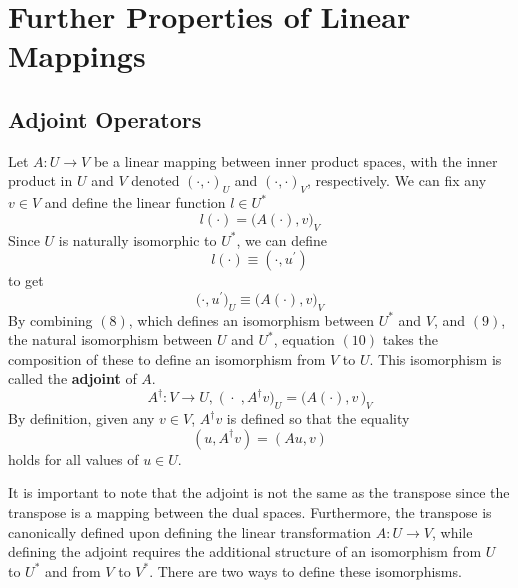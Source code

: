\section{Further Properties of Linear Mappings}

\subsection{Adjoint Operators}

  \begin{definition}
    Let $A: U \longrightarrow V$ be a linear mapping between inner product spaces, with the inner product in $U$ and $V$ denoted $(\cdot,\cdot)_U$ and $(\cdot,\cdot)_V$, respectively. We can fix any $v \in V$ and define the linear function $l \in U^\ast$
    \begin{equation}
      l(\cdot) = \big(A(\cdot), v\big)_V
    \end{equation}
    Since $U$ is naturally isomorphic to $U^\ast$, we can define
    \begin{equation}
      l(\cdot) \equiv (\cdot, u^\prime)
    \end{equation} 
    to get 
    \begin{equation}
      \big(\cdot, u^\prime \big)_U \equiv \big(A(\cdot), v \big)_V
    \end{equation}
    By combining $(8)$, which defines an isomorphism between $U^\ast$ and $V$, and $(9)$, the natural isomorphism between $U$ and $U^\ast$, equation $(10)$ takes the composition of these to define an isomorphism from $V$ to $U$. This isomorphism is called the \textbf{adjoint} of $A$. 
    \begin{equation}
      A^\dagger: V \longrightarrow U, \;  \big(\; \cdot \;, A^\dagger v \big)_U = \big( A(\cdot), v \,\big)_V 
    \end{equation}
    By definition, given any $v \in V$, $A^\dagger v$ is defined so that the equality
    \begin{equation}
      (u, A^\dagger v) = (A u, v)
    \end{equation}
    holds for all values of $u \in U$. 
  \end{definition}

  It is important to note that the adjoint is not the same as the transpose since the transpose is a mapping between the dual spaces. Furthermore, the transpose is canonically defined upon defining the linear transformation $A: U \longrightarrow V$, while defining the adjoint requires the additional structure of an isomorphism from $U$ to $U^\ast$ and from $V$ to $V^\ast$. There are two ways to define these isomorphisms. 

